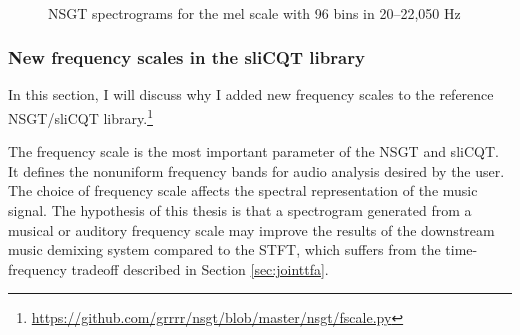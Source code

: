 \documentclass[report.tex]{subfiles}
\begin{document}
\begin{figure}[ht]
	\centering
	\\
	\caption{NSGT spectrograms for the mel scale with 96 bins in 20--22,050 Hz}
	\label{fig:overlappedspectrograms}
\end{figure}

\subsubsection{New frequency scales in the sliCQT library}
\label{sec:improvelib}

In this section, I will discuss why I added new frequency scales to the reference NSGT/sliCQT library.\footnote{\url{https://github.com/grrrr/nsgt/blob/master/nsgt/fscale.py}}

The frequency scale is the most important parameter of the NSGT and sliCQT. It defines the nonuniform frequency bands for audio analysis desired by the user. The choice of frequency scale affects the spectral representation of the music signal. The hypothesis of this thesis is that a spectrogram generated from a musical or auditory frequency scale may improve the results of the downstream music demixing system compared to the STFT, which suffers from the time-frequency tradeoff described in Section \ref{sec:jointtfa}.
\end{document}
